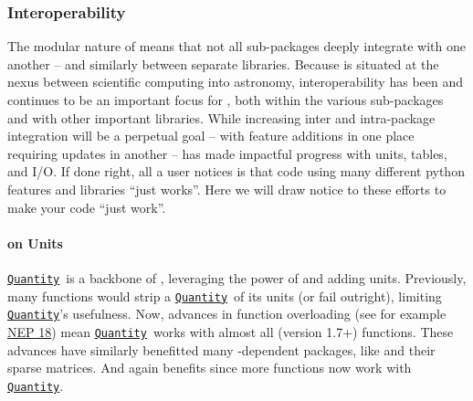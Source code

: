 \documentclass[modern]{aastex631}
\newcommand{\astropyapi}[2]{\href{https://docs.astropy.org/en/stable/api/astropy.#1.html}{#2}}
\newcommand{\astropyapidoc}[2]{\astropyapi{#1}{\texttt{#2}\xspace}}
\newcommand{\astropyQuantity}{\astropyapidoc{units.Quantity}{Quantity}}
\begin{document}
\subsubsection*{Interoperability} \label{sec:core-features-interoperability}


  The modular nature of \astropypkg means that not all sub-packages deeply
  integrate with one another -- and similarly between separate \python
  libraries. Because \astropy is situated at the nexus between scientific
  computing into astronomy, interoperability has been and continues to be an
  important focus for \astropy, both within the various \astropypkg sub-packages
  and with other important \python libraries. While increasing inter and
  intra-package integration will be a perpetual goal -- with feature additions
  in one place requiring updates in another -- \astropy has made impactful
  progress with units, tables, and I/O.
  If done right, all a user notices is that code using many different python
  features and libraries ``just works''. Here we will draw notice to these
  efforts to make your code ``just work''.

  \paragraph{ on Units}

    \astropyQuantity\ is a backbone of \astropy, leveraging the power of
     and adding units. Previously, many  functions
    would strip a \astropyQuantity\ of its units (or fail outright), limiting
    \astropyQuantity's usefulness. Now, advances in  function
    overloading (see for example
    \href{https://numpy.org/neps/nep-0018-array-function-protocol.html}{NEP 18})
    mean \astropyQuantity\ works with almost all  (version 1.7+)
    functions. These advances have similarly benefitted many
    -dependent packages, like  and their sparse
    matrices. And again \astropypkg benefits since more 
    functions now work with \astropyQuantity.
\end{document}
